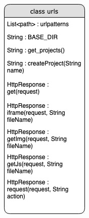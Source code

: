 \documentclass[12pt]{extarticle}
\begin{document}
\begin{figure}[H]
    \centering
    \begin{subfigure}[b]{0.35\textwidth}
        \includegraphics[width=\textwidth]{img2.jpeg}
        \label{fig:arc_1}
    \end{subfigure}
\end{figure}
\end{document}
